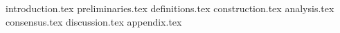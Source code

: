{introduction.tex}
{preliminaries.tex}
{definitions.tex}
{construction.tex}
{analysis.tex}
{consensus.tex}
{discussion.tex}
\iflong
{appendix.tex}
\fi